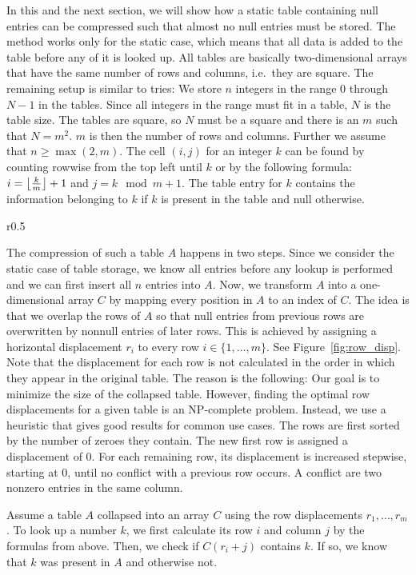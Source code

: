 In this and the next section, we will show how a static table containing null entries can be compressed such that almost no null entries must be stored.
The method works only for the static case, which means that all data is added to the table before any of it is looked up.
All tables are basically two-dimensional arrays that have the same number of rows and columns, i.e.\ they are square.
The remaining setup is similar to tries:
We store $n$ integers in the range $0$ through $N - 1$ in the tables.
Since all integers in the range must fit in a table, $N$ is the table size.
The tables are square, so $N$ must be a square and there is an $m$ such that $N = m^2$.
$m$ is then the number of rows and columns.
Further we assume that $n \geq \max(2, m)$.
The cell $(i, j)$ for an integer $k$ can be found by counting rowwise from the top left until $k$ or by the following formula: $i = \left\lfloor \frac{k}{m} \right\rfloor + 1$ and $j = k \mod m + 1$.
The table entry for $k$ contains the information belonging to $k$ if $k$ is present in the table and null otherwise.

\begin{wrapfigure}{r}{0.5\textwidth}
  
	\caption{ \small Rows of a table displaced and collapsed into a one-dimensional array. \label{fig:row_disp}}
\end{wrapfigure}

The compression of such a table $A$ happens in two steps.
Since we consider the static case of table storage, we know all entries before any lookup is performed and we can first insert all $n$ entries into $A$.
Now, we transform $A$ into a one-dimensional array $C$ by mapping every position in $A$ to an index of $C$.
The idea is that we overlap the rows of $A$ so that null entries from previous rows are overwritten by nonnull entries of later rows.
This is achieved by assigning a horizontal displacement $r_i$ to every row $i \in \{ 1, \ldots, m \}$.
See Figure~\ref{fig:row_disp}.
Note that the displacement for each row is not calculated in the order in which they appear in the original table.
The reason is the following:
Our goal is to minimize the size of the collapsed table.
However, finding the optimal row displacements for a given table is an NP-complete problem.
Instead, we use a heuristic that gives good results for common use cases.
The rows are first sorted by the number of zeroes they contain.
The new first row is assigned a displacement of 0.
For each remaining row, its displacement is increased stepwise, starting at 0, until no conflict with a previous row occurs.
A conflict are two nonzero entries in the same column.

Assume a table $A$ collapsed into an array $C$ using the row displacements $r_1, \ldots, r_m$.
To look up a number $k$, we first calculate its row $i$ and column $j$ by the formulas from above.
Then, we check if $C( r_i + j )$ contains $k$.
If so, we know that $k$ was present in $A$ and otherwise not.
